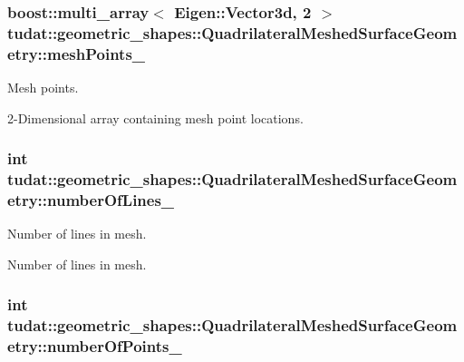 \subsubsection[{\texorpdfstring{mesh\+Points\+\_\+}{meshPoints_}}]{\setlength{\rightskip}{0pt plus 5cm}boost\+::multi\+\_\+array$<$ Eigen\+::\+Vector3d, 2 $>$ tudat\+::geometric\+\_\+shapes\+::\+Quadrilateral\+Meshed\+Surface\+Geometry\+::mesh\+Points\+\_\+\hspace{0.3cm}{\ttfamily [protected]}}\hypertarget{classtudat_1_1geometric__shapes_1_1QuadrilateralMeshedSurfaceGeometry_aaa6f41fadbe6a187c441ab23feba8e68}{}\label{classtudat_1_1geometric__shapes_1_1QuadrilateralMeshedSurfaceGeometry_aaa6f41fadbe6a187c441ab23feba8e68}


Mesh points. 

2-\/\+Dimensional array containing mesh point locations. 
\subsubsection[{\texorpdfstring{number\+Of\+Lines\+\_\+}{numberOfLines_}}]{\setlength{\rightskip}{0pt plus 5cm}int tudat\+::geometric\+\_\+shapes\+::\+Quadrilateral\+Meshed\+Surface\+Geometry\+::number\+Of\+Lines\+\_\+\hspace{0.3cm}{\ttfamily [protected]}}\hypertarget{classtudat_1_1geometric__shapes_1_1QuadrilateralMeshedSurfaceGeometry_a1eeb4e61e296455cf92a869f043f5341}{}\label{classtudat_1_1geometric__shapes_1_1QuadrilateralMeshedSurfaceGeometry_a1eeb4e61e296455cf92a869f043f5341}


Number of lines in mesh. 

Number of lines in mesh. 
\subsubsection[{\texorpdfstring{number\+Of\+Points\+\_\+}{numberOfPoints_}}]{\setlength{\rightskip}{0pt plus 5cm}int tudat\+::geometric\+\_\+shapes\+::\+Quadrilateral\+Meshed\+Surface\+Geometry\+::number\+Of\+Points\+\_\+\hspace{0.3cm}{\ttfamily [protected]}}\hypertarget{classtudat_1_1geometric__shapes_1_1QuadrilateralMeshedSurfaceGeometry_a8d2057019d4b46515e48dfa196ac4af0}{}\label{classtudat_1_1geometric__shapes_1_1QuadrilateralMeshedSurfaceGeometry_a8d2057019d4b46515e48dfa196ac4af0}


